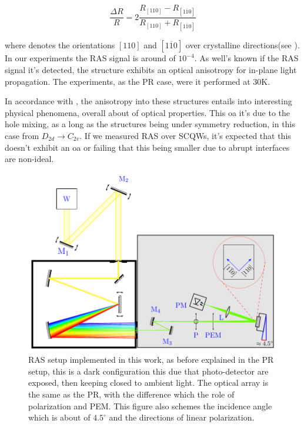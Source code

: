 \begin{equation}\label{eqn:chapter-3-sec-ras-rasequation}
\dfrac{\Delta R}{R} = 2\dfrac{R_{\left[110\right]}-R_{\left[1\overline{1}0\right]}}{R_{\left[110\right]}+
R_{\left[1\overline{1}0\right]}}
\end{equation}

where denotes the orientations $\left[110\right]$ and $\left[1\overline{1}0\right]$ over crystalline directions(see ). In our experiments the \gls{RAS} signal is around of $10^{-4}$. As well's known if the \gls{RAS} signal it's detected, the structure exhibits an optical anisotropy for in-plane light propagation\cite{koopmans1998microscopic}. The experiments, as the PR case, were it performed at 30K. 

In accordance with , the anisotropy into these structures entails into interesting physical phenomena, overall about of optical properties. This \gls{oa} it's due to the hole mixing, as a long as the structures being under symmetry reduction, in this case from $D_{2d}\to C_{2v}$. If we measured RAS over \gls{SCQWs}, it's expected that this doesn't exhibit an \gls{oa} or failing that this being smaller due to abrupt interfaces are non-ideal. 


\begin{figure}[H]
	\centering
	\includegraphics[width=\textwidth]{../figures/chapter-3/ras-setup/build/ras-setup-2.pdf}
	\caption[RAS Scheme]{RAS setup implemented in this work, as  before explained in the PR  setup, this is a  dark configuration this due that photo-detector are exposed, then keeping closed to ambient light. The optical array is the same as the PR, with the difference which the role of polarization and PEM. This figure also schemes the  incidence angle which is about of $4.5^{\circ}$ and the directions of linear polarization.  }
	\label{fig:chapter-3-ras-setup}
\end{figure}

